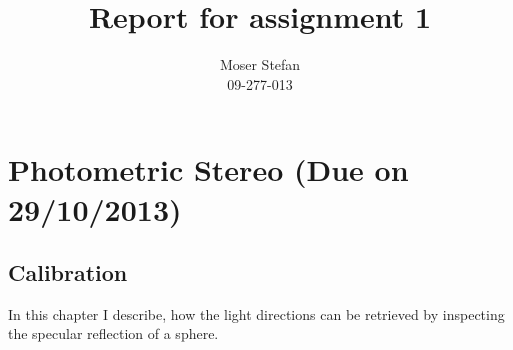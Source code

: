 \documentclass{paper}
\title{Report for assignment 1}
\author{Moser Stefan\\09-277-013}
\begin{document}
\maketitle


%

\section{Photometric Stereo (Due on 29/10/2013)}

\subsection{Calibration}
In this chapter I describe, how the light directions can be retrieved by 
inspecting the specular reflection of a sphere.
\end{document}
